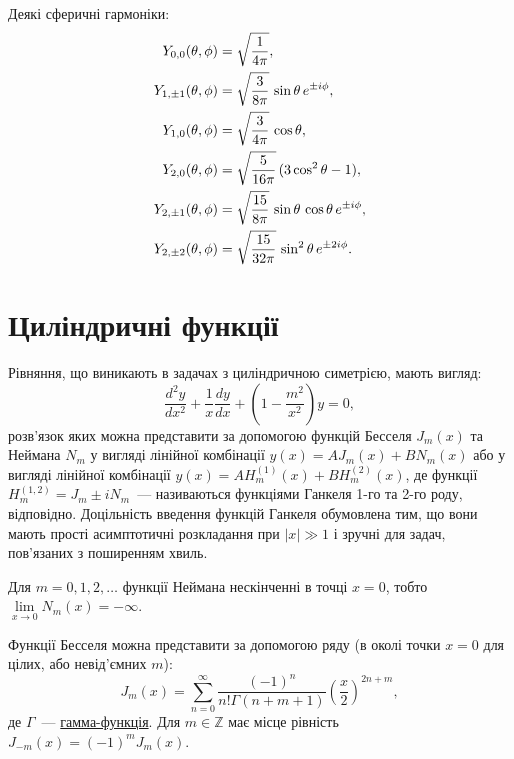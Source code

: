 Деякі сферичні гармоніки:
\begin{align*}
	Y_{0,0}(\theta,\phi)     & =\sqrt{1\over 4\pi},                                            \\
	Y_{1,\pm 1}(\theta,\phi) & =\sqrt{3\over 8\pi} \, \sin\theta \, e^{\pm i\phi},             \\
	Y_{1,0}(\theta,\phi)     & =\sqrt{3\over 4\pi}\, \cos\theta ,                              \\
	Y_{2,0}(\theta,\phi)     & =\sqrt{5\over 16\pi}\, (3\cos^{2}\theta-1),                     \\
	Y_{2,\pm 1}(\theta,\phi) & =\sqrt{15\over 8\pi}\, \sin\theta\, \cos\theta\, e^{\pm i\phi}, \\
	Y_{2,\pm 2}(\theta,\phi) & =\sqrt{15\over 32\pi} \, \sin^{2}\theta \, e^{\pm2i\phi}.
\end{align*}

\section{Циліндричні функції}\setcounter{equation}{0}

Рівняння, що виникають в задачах з циліндричною симетрією, мають вигляд:
	\begin{equation}\label{eq:Bessel_eq}
		\frac{d^2y}{dx^2} + \frac1x\frac{dy}{dx} + \left(1 - \frac{m^2}{x^2} \right) y = 0,
	\end{equation}
	розв'язок яких можна представити за допомогою функцій Бесселя $J_m(x)$ та Неймана $N_m$ у вигляді лінійної комбінації $y(x) = A J_m(x) + B N_m(x)$ або у вигляді лінійної комбінації $y(x) = A H^{(1)}_m(x) + B H^{(2)}_m(x)$, де функції $H_m^{(1,2)} =J_m \pm i N_m$~--- називаються функціями Ганкеля 1-го та 2-го роду, відповідно. Доцільність введення функцій Ганкеля обумовлена тим, що вони мають прості асимптотичні розкладання при $|x| \gg 1$ і зручні для задач, пов'язаних з поширенням хвиль.

Для $m = 0,1,2,\ldots$ функції Неймана нескінченні в точці $x = 0$, тобто $\lim\limits_{x\to0}N_m(x) = -\infty$.

Функції Бесселя можна представити за допомогою ряду (в околі точки $x = 0$ для цілих, або невід'ємних $m$):
\begin{equation}\label{eq:J}
    J_m(x) = \sum_{n=0}^\infty \frac{(-1)^n}{n! \Gamma(n+m+1)} {\left({\frac{x}{2}}\right)}^{2n+m},
\end{equation}
де $ \Gamma$~--- \href{https://en.wikipedia.org/wiki/Gamma_function}{гамма-функція}. Для $m \in \mathbb{Z}$ має місце рівність $J_{-m}(x)  = (-1)^m J_m(x)$.

